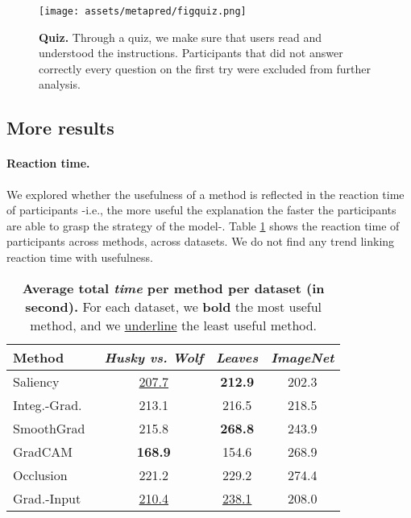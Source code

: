 \clearpage
\begin{figure*}
    \centering
    \texttt{[image: assets/metapred/figquiz.png]}
    \caption{\textbf{Quiz.} Through a quiz, we make sure that users read and understood the instructions. Participants that did not answer correctly every question on the first try were excluded from further analysis.}
    \label{fig:quiz}
\end{figure*}

\subsection{More results}
\paragraph{Reaction time.}
We explored whether the usefulness of a method is reflected in the reaction time of participants -i.e., the more useful the explanation the faster the participants are able to grasp the strategy of the model-. Table \ref{tab:time} shows the reaction time of participants across methods, across datasets. We do not find any trend linking reaction time with usefulness.
\begin{table}[h]
\vspace{2mm}
\centering
\begin{tabular}{lccc}
\toprule
 Method & \textit{Husky vs. Wolf} & \textit{Leaves} & \textit{ImageNet} \\
\midrule
Saliency~\cite{simonyan2014deep}                  & \underline{207.7} & \textbf{212.9} & 202.3 \\
Integ.-Grad.~\cite{sundararajan2017axiomatic}     & 213.1 & 216.5 & 218.5 \\
SmoothGrad~\cite{smilkov2017smoothgrad}           & 215.8 & \textbf{268.8} & 243.9 \\
GradCAM~\cite{selvaraju2017gradcam}               & \textbf{168.9} & 154.6 & 268.9\\
Occlusion~\cite{zeiler2014visualizing}            & 221.2 & 229.2 & 274.4 \\
Grad.-Input~\cite{shrikumar2017learning}               & \underline{210.4} & \underline{238.1} & 208.0 \\
\bottomrule
\end{tabular}
\vspace{2mm}
\caption{\textbf{ Average total \textit{time} per method per dataset (in second).} For each dataset, we \textbf{bold} the most useful method, and we \underline{underline} the least useful method.}
\label{tab:time}
\vspace{-2mm}
\end{table}
\clearpage


